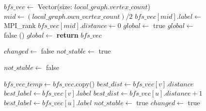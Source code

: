 \documentclass[conference]{IEEEtran}
\begin{document}
\begin{figure}  
    \begin{algorithmic}[1]  
    \State $bfs\_vec \gets$ Vector(size: $local\_graph.vertex\_count$)
    \State $mid \gets (local\_graph.own\_vertex\_count) /2$
    \State $bfs\_vec[mid].label \gets $ MPI\_rank
    \State $bfs\_vec[mid].distance \gets 0$
    \State $global \gets $ true
        \State $global \gets $ false
        \State {}()
        \State $global \gets$ 
    \EndWhile
    \State \textbf{return} $bfs\_vec$
    
    \EndProcedure  
    \end{algorithmic}

    \vspace{10pt}

    \begin{algorithmic}[1]  
    



    \vspace{10pt}


    \State $changed \gets $ false
    \State $not\_stable \gets $ true

        \State $not\_stable \gets $ false
        
        \State $bfs\_vec\_temp \gets bfs\_vec$.copy()
        \State $best\_dist \gets bfs\_vec[v].distance$
        \State $best\_label \gets bfs\_vec[v].label$ 
                \State $best\_dist \gets bfs\_vec[u].distance + 1$
                \State $best\_label \gets bfs\_vec[u].label$
                \State $not\_stable \gets $ true
                \State $changed \gets $ true


\end{algorithmic}
\end{figure}
\end{document}
